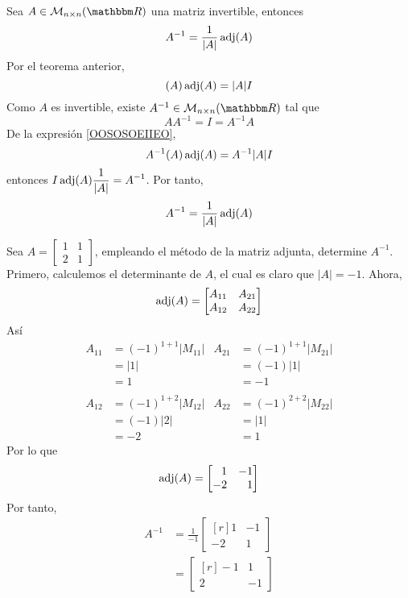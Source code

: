 \begin{corollary}
    Sea $A \in \mathcal{M}_{n \times n}(\RR)$ una matriz invertible, entonces
    \begin{equation}
        A^{-1} = \frac{1}{|A|} \operatorname{adj}(A) \label{ADJUNTODEMATRIZ}
    \end{equation}
    \demostracion
    Por el teorema anterior,
    \begin{equation}
        (A) \operatorname{adj}(A) = |A| I \label{OOSOSOEIIEO}
    \end{equation}
    Como $A$ es invertible, existe $A^{-1} \in \mathcal{M}_{n \times n}(\RR)$ tal que
    $$AA^{-1} = I = A^{-1}A$$
    De la expresión \eqref{OOSOSOEIIEO},
    $$A^{-1}(A)\operatorname{adj}(A) = A^{-1} |A| I$$
    entonces $\displaystyle I \operatorname{adj}(A) \frac{1}{|A|} = A^{-1}$. Por tanto,
    $$A^{-1} = \frac{1}{|A|} \operatorname{adj}(A)$$
\end{corollary}

\begin{example}
    Sea $A = \begin{bmatrix}
        1 & 1 \\
        2 & 1
    \end{bmatrix}$, empleando el método de la matriz adjunta, determine $A^{-1}$. \\
    \solucion Primero, calculemos el determinante de $A$, el cual es claro que $|A| = -1$. Ahora,
    $$\operatorname{adj}(A) = \begin{bmatrix}
        A_{11} & A_{21} \\
        A_{12} & A_{22}
    \end{bmatrix}$$
    Así
    \begin{align*}
        A_{11} & = (-1)^{1+1}|M_{11}| & A_{21} & = (-1)^{1+1}|M_{21}| \\
        & = |1| & & = (-1)|1| \\
        & = 1 & & = -1 \\
        & \\
        A_{12} & = (-1)^{1+2}|M_{12}| & A_{22} & = (-1)^{2+2}|M_{22}| \\
        & = (-1)|2| & & = |1| \\
        & = -2 & & = 1
    \end{align*}
    Por lo que
    $$\Adj(A) = \begin{bmatrix*}[r]
        1 & -1 \\
        -2 & 1
    \end{bmatrix*}$$
    Por tanto,
    \begin{align*}
        A^{-1} & = \frac{1}{-1} \begin{bmatrix*}[r]
            1 & -1 \\
            -2 & 1
        \end{bmatrix*} \\
        & = \begin{bmatrix*}[r]
            -1 & 1 \\
            2 & -1
        \end{bmatrix*}
    \end{align*}
\end{example}

